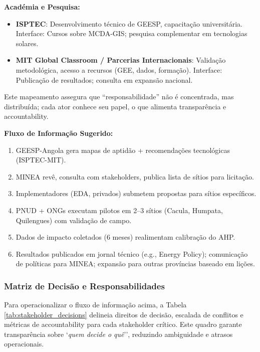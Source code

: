 \documentclass[12pt, a4paper]{article}
\begin{document}
\textbf{Académia e Pesquisa:}
\begin{itemize}
\item \textbf{ISPTEC}: Desenvolvimento técnico de GEESP, capacitação universitária. Interface: Cursos sobre MCDA-GIS; pesquisa complementar em tecnologias solares.
\item \textbf{MIT Global Classroom / Parcerias Internacionais}: Validação metodológica, acesso a recursos (GEE, dados, formação). Interface: Publicação de resultados; consulta em expansão nacional.
\end{itemize}

Este mapeamento assegura que ``responsabilidade'' não é concentrada, mas distribuída; cada ator conhece seu papel, o que alimenta transparência e accountability.

\textbf{Fluxo de Informação Sugerido:}

\begin{enumerate}
\item GEESP-Angola gera mapas de aptidão + recomendações tecnológicas (ISPTEC-MIT).
\item MINEA revê, consulta com stakeholders, publica lista de sítios para licitação.
\item Implementadores (EDA, privados) submetem propostas para sítios específicos.
\item PNUD + ONGs executam pilotos em 2--3 sítios (Cacula, Humpata, Quilengues) com validação de campo.
\item Dados de impacto coletados (6 meses) realimentam calibração do AHP.
\item Resultados publicados em jornal técnico (e.g., Energy Policy); comunicação de políticas para MINEA; expansão para outras províncias baseado em lições.
\end{enumerate}

\subsubsection{Matriz de Decisão e Responsabilidades}

Para operacionalizar o fluxo de informação acima, a Tabela \ref{tab:stakeholder_decisions} delineia direitos de decisão, escalada de conflitos e métricas de accountability para cada stakeholder crítico. Este quadro garante transparência sobre `\textit{quem decide o quê}'', reduzindo ambiguidade e atrasos operacionais.
\end{document}
